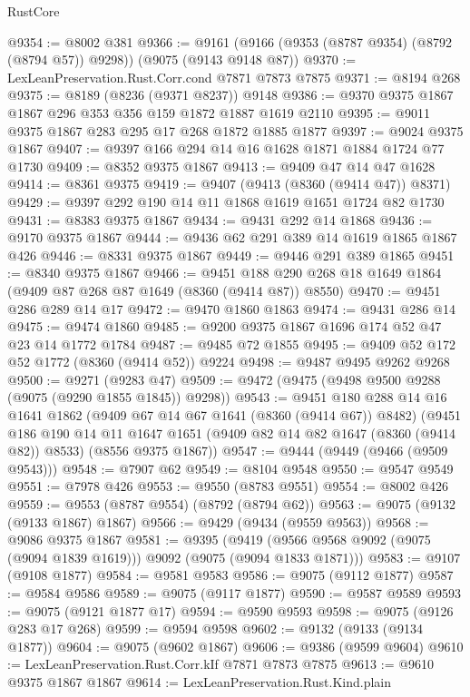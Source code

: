 \begin{lexlean}{RustCore}
\begin{coremodule}
@9354 := @8002 @381
@9366 := @9161 (@9166 (@9353 (@8787 @9354) (@8792 (@8794 @57)) @9298)) (@9075 (@9143 @9148 @87))
@9370 := LexLeanPreservation.Rust.Corr.cond @7871 @7873 @7875
@9371 := @8194 @268
@9375 := @8189 (@8236 (@9371 @8237)) @9148
@9386 := @9370 @9375 @1867 @1867 @296 @353 @356 @159 @1872 @1887 @1619 @2110
@9395 := @9011 @9375 @1867 @283 @295 @17 @268 @1872 @1885 @1877
@9397 := @9024 @9375 @1867
@9407 := @9397 @166 @294 @14 @16 @1628 @1871 @1884 @1724 @77 @1730
@9409 := @8352 @9375 @1867
@9413 := @9409 @47 @14 @47 @1628
@9414 := @8361 @9375
@9419 := @9407 (@9413 (@8360 (@9414 @47)) @8371)
@9429 := @9397 @292 @190 @14 @11 @1868 @1619 @1651 @1724 @82 @1730
@9431 := @8383 @9375 @1867
@9434 := @9431 @292 @14 @1868
@9436 := @9170 @9375 @1867
@9444 := @9436 @62 @291 @389 @14 @1619 @1865 @1867 @426
@9446 := @8331 @9375 @1867
@9449 := @9446 @291 @389 @1865
@9451 := @8340 @9375 @1867
@9466 := @9451 @188 @290 @268 @18 @1649 @1864 (@9409 @87 @268 @87 @1649 (@8360 (@9414 @87)) @8550)
@9470 := @9451 @286 @289 @14 @17
@9472 := @9470 @1860 @1863
@9474 := @9431 @286 @14
@9475 := @9474 @1860
@9485 := @9200 @9375 @1867 @1696 @174 @52 @47 @23 @14 @1772 @1784
@9487 := @9485 @72 @1855
@9495 := @9409 @52 @172 @52 @1772 (@8360 (@9414 @52)) @9224
@9498 := @9487 @9495 @9262 @9268
@9500 := @9271 (@9283 @47)
@9509 := @9472 (@9475 (@9498 @9500 @9288 (@9075 (@9290 @1855 @1845)) @9298))
@9543 := @9451
    @180
    @288
    @14
    @16
    @1641
    @1862
    (@9409 @67 @14 @67 @1641 (@8360 (@9414 @67)) @8482)
    (@9451
      @186
      @190
      @14
      @11
      @1647
      @1651
      (@9409 @82 @14 @82 @1647 (@8360 (@9414 @82)) @8533)
      (@8556 @9375 @1867))
@9547 := @9444 (@9449 (@9466 (@9509 @9543)))
@9548 := @7907 @62
@9549 := @8104 @9548
@9550 := @9547 @9549
@9551 := @7978 @426
@9553 := @9550 (@8783 @9551)
@9554 := @8002 @426
@9559 := @9553 (@8787 @9554) (@8792 (@8794 @62))
@9563 := @9075 (@9132 (@9133 @1867) @1867)
@9566 := @9429 (@9434 (@9559 @9563))
@9568 := @9086 @9375 @1867
@9581 := @9395
    (@9419 (@9566 @9568 @9092 (@9075 (@9094 @1839 @1619))) @9092 (@9075 (@9094 @1833 @1871)))
@9583 := @9107 (@9108 @1877)
@9584 := @9581 @9583
@9586 := @9075 (@9112 @1877)
@9587 := @9584 @9586
@9589 := @9075 (@9117 @1877)
@9590 := @9587 @9589
@9593 := @9075 (@9121 @1877 @17)
@9594 := @9590 @9593
@9598 := @9075 (@9126 @283 @17 @268)
@9599 := @9594 @9598
@9602 := @9132 (@9133 (@9134 @1877))
@9604 := @9075 (@9602 @1867)
@9606 := @9386 (@9599 @9604)
@9610 := LexLeanPreservation.Rust.Corr.kIf @7871 @7873 @7875
@9613 := @9610 @9375 @1867 @1867
@9614 := LexLeanPreservation.Rust.Kind.plain

\end{coremodule}
\end{lexlean}
